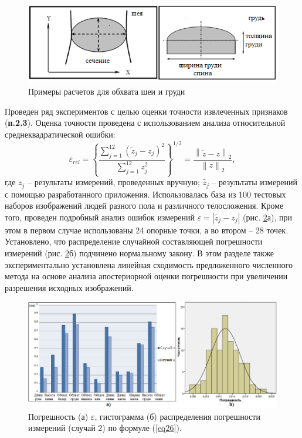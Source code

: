 \begin{figure}[ht!]
\centering
\includegraphics [width=0.8\linewidth] {images/h2.png}
\begin{center}
\caption{Примеры расчетов для обхвата шеи и груди} \label{img2}
\end{center}
\end{figure}

Проведен ряд экспериментов с целью оценки точности извлеченных признаков (\textbf{п.2.3}). Оценка точности проведена с использованием анализа относительной среднеквадратической ошибки:
\begin{equation}\label{eq26}
\varepsilon_{rel}=\left\{\frac{\sum^{12}_{j=1}\left(\widetilde{z}_j - z_j\right)^2}{\sum^{12}_{j=1}z_j^2}\right\}^{1/2} = \frac{\left\|\widetilde{z} -z\right\|_2}{\left\|z\right\|_2},
\end{equation}
где $z_j$ -- результаты измерений, проведенных вручную;
$\widetilde{z_j}$ -- результаты измерений с помощью разработанного приложения. Использовалась база из 100 тестовых наборов изображений людей разного пола и различного телосложения. Кроме того, проведен подробный анализ ошибок измерений $\varepsilon = \left|\widetilde{z_j} - z_j\right|$ (рис. \ref{img16}а), при этом в первом случае использованы 24 опорные точки, а во втором -- 28 точек. Установлено, что распределение случайной составляющей погрешности измерений (рис. \ref{img16}б) подчинено нормальному закону. В этом разделе также экспериментально установлена линейная сходимость предложенного численного метода на основе анализа апостериорной оценки погрешности при увеличении разрешения исходных изображений.
\begin{figure}[ht!]
\centering
\includegraphics [width=0.96\linewidth] {images/h16.png}
\begin{center}
\caption{Погрешность (а) $\varepsilon$, гистограмма (б) распределения погрешности измерений (случай 2) по формуле (\ref{eq26}).} \label{img16}
\end{center}
\end{figure}

